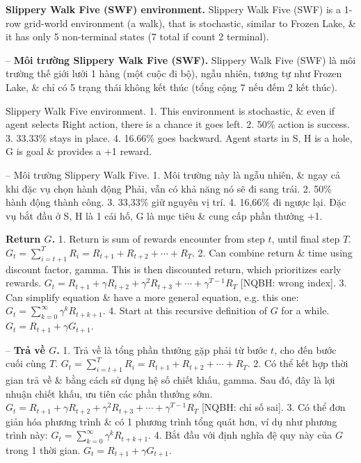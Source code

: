 \documentclass{article}
\begin{document}
\begin{itemize}
\begin{itemize}
        {\bf Slippery Walk Five (SWF) environment.} Slippery Walk Five (SWF) is a 1-row grid-world environment (a walk), that is stochastic, similar to Frozen Lake, \& it has only 5 non-terminal states (7 total if count 2 terminal).

        -- {\bf Môi trường Slippery Walk Five (SWF).} Slippery Walk Five (SWF) là môi trường thế giới lưới 1 hàng (một cuộc đi bộ), ngẫu nhiên, tương tự như Frozen Lake, \& chỉ có 5 trạng thái không kết thúc (tổng cộng 7 nếu đếm 2 kết thúc).

        {\sf Slippery Walk Five environment.} 1. This environment is stochastic, \& even if agent selects Right action, there is a chance it goes left. 2. 50\% action is success. 3. 33.33\% stays in place. 4. 16.66\% goes backward. Agent starts in S, H is a hole, G is goal \& provides a +1 reward.

        -- {\sf Môi trường Slippery Walk Five.} 1. Môi trường này là ngẫu nhiên, \& ngay cả khi đặc vụ chọn hành động Phải, vẫn có khả năng nó sẽ đi sang trái. 2. 50\% hành động thành công. 3. 33,33\% giữ nguyên vị trí. 4. 16,66\% đi ngược lại. Đặc vụ bắt đầu ở S, H là 1 cái hố, G là mục tiêu \& cung cấp phần thưởng +1.

        {\bf Return $G$.} 1. Return is sum of rewards encounter from step $t$, until final step $T$. $G_t = \sum_{i=t+1}^T R_i = R_{t+1} + R_{t+2} + \cdots + R_T$. 2. Can combine return \& time using discount factor, gamma. This is then discounted return, which prioritizes early rewards. $G_t = R_{t+1} + \gamma R_{t+2} + \gamma^2R_{t+3} + \cdots + \gamma^{T-1}R_T$ [NQBH: wrong index]. 3. Can simplify equation \& have a more general equation, e.g. this one: $G_t = \sum_{k=0}^\infty \gamma^kR_{t + k + 1}$. 4. Start at this recursive definition of $G$ for a while. $G_t = R_{t+1} + \gamma G_{t+1}$.

        -- {\bf Trả về $G$.} 1. Trả về là tổng phần thưởng gặp phải từ bước $t$, cho đến bước cuối cùng $T$. $G_t = \sum_{i=t+1}^T R_i = R_{t+1} + R_{t+2} + \cdots + R_T$. 2. Có thể kết hợp thời gian trả về \& bằng cách sử dụng hệ số chiết khấu, gamma. Sau đó, đây là lợi nhuận chiết khấu, ưu tiên các phần thưởng sớm. $G_t = R_{t+1} + \gamma R_{t+2} + \gamma^2R_{t+3} + \cdots + \gamma^{T-1}R_T$ [NQBH: chỉ số sai]. 3. Có thể đơn giản hóa phương trình \& có 1 phương trình tổng quát hơn, ví dụ như phương trình này: $G_t = \sum_{k=0}^\infty \gamma^kR_{t + k + 1}$. 4. Bắt đầu với định nghĩa đệ quy này của $G$ trong 1 thời gian. $G_t = R_{t+1} + \gamma G_{t+1}$.


\end{itemize}
\end{itemize}
\end{document}
